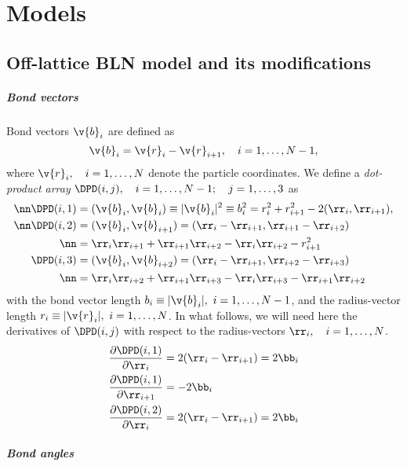 \chapter{Models}

\section{Off-lattice BLN model and its modifications}

\paragraph{Bond vectors}

Bond vectors $\v{b}_i$ are defined as 
\begin{equation}
  \v{b}_i=\v{r}_i-\v{r}_{i+1},\quad i=1,\ldots,N-1,
  \label{bln-def-bv}
\end{equation}
where $\v{r}_i,\quad i=1,\ldots,N$ denote the particle coordinates. We define
a \emph{dot-product array} $\DPD(i,j),\quad i=1,\ldots, N-1;\quad j=1,\ldots,3$ as
\begin{align}
  \nn\DPD(i,1)&=(\v{b}_i,\v{b}_i)\equiv |\v{b}_i|^2\equiv b_i^2=r_i^2+r_{i+1}^2-2(\rr_i,\rr_{i+1}),\\
  \nn\DPD(i,2)&=(\v{b}_i,\v{b}_{i+1})=(\rr_i-\rr_{i+1},\rr_{i+1}-\rr_{i+2})\\
\nn&=\rr_i\rr_{i+1}+\rr_{i+1}\rr_{i+2}-\rr_i\rr_{i+2}-r_{i+1}^2\\
  \DPD(i,3)&=(\v{b}_i,\v{b}_{i+2})=(\rr_i-\rr_{i+1},\rr_{i+2}-\rr_{i+3})\\
\nn&=\rr_i\rr_{i+2}+\rr_{i+1}\rr_{i+3}-\rr_{i}\rr_{i+3}-\rr_{i+1}\rr_{i+2}
  \label{bln-def-dpd}
\end{align}
with the bond vector length $b_i\equiv|\v{b}_i|,\ i=1,\ldots,N-1$, 
and the radius-vector length $r_i\equiv|\v{r}_i|,\ i=1,\ldots,N$. 
In what follows, we will need here the derivatives 
of $\DPD(i,j)$ with respect to the radius-vectors $\rr_i,\quad i=1,\ldots,N$.
\begin{align}
  \frac{\partial\DPD(i,1)}{\partial \rr_i}&=2(\rr_i-\rr_{i+1})=2\bb_i\\
  \frac{\partial\DPD(i,1)}{\partial \rr_{i+1}}&=-2\bb_i\\
  \frac{\partial\DPD(i,2)}{\partial \rr_i}&=2(\rr_i-\rr_{i+1})=2\bb_i\\
\end{align}

\paragraph{Bond angles}

